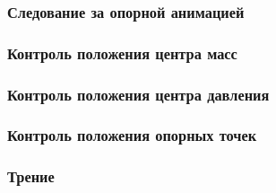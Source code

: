 \subsubsection{Следование за опорной анимацией}


\subsubsection{Контроль положения центра масс}


\subsubsection{Контроль положения центра давления}


\subsubsection{Контроль положения опорных точек}


\subsubsection{Трение}




